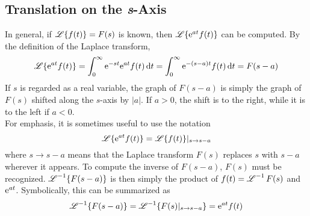 \documentclass[./Differential Equations.tex]{subfiles}
\begin{document}
		\subsection{Translation on the \textit{s}-Axis}
				In general, if \(\operatorname{\mathscr{L}}\{f(t)\} = F(s)\) is known, then \(\operatorname{\mathscr{L}}\{\text{e}^{at}f(t)\}\) can be computed.
				By the definition of the Laplace transform,
				\[
					\operatorname{\mathscr{L}}\{\text{e}^{at}f(t)\} = \int_0^\infty \text{e}^{-st}\text{e}^{at}f(t)\dd{t}
						= \int_0^\infty \text{e}^{-(s - a)t}f(t)\dd{t}
						= F(s - a)
				\]
				If \(s\) is regarded as a real variable, the graph of \(F(s - a)\) is simply the graph of \(F(s)\) shifted along the \(s\)-axis by \(|a|\). If \(a > 0\), the shift is to the right, while it is to the left if \(a < 0\). \\
				For emphasis, it is sometimes useful to use the notation
					\[\operatorname{\mathscr{L}}\{\text{e}^{at}f(t)\} = \operatorname{\mathscr{L}}\{f(t)\}|_{s \to s - a}\]
					where \(s \to s - a\) means that the Laplace transform \(F(s)\) replaces \(s\) with \(s - a\) wherever it appears.
				To compute the inverse of \(F(s - a)\), \(F(s)\) must be recognized. \(\operatorname{\mathscr{L}}^{-1}\{F(s - a)\}\) is then simply the product of \(f(t) = \operatorname{\mathscr{L}}^{-1}F(s)\) and \(\text{e}^{at}\). Symbolically, this can be summarized as
					\[
						\operatorname{\mathscr{L}}^{-1}\{F(s - a)\} = \operatorname{\mathscr{L}}^{-1}\{F(s)|_{s \to s - a}\}
							= \text{e}^{at}f(t)
					\]
\end{document}
